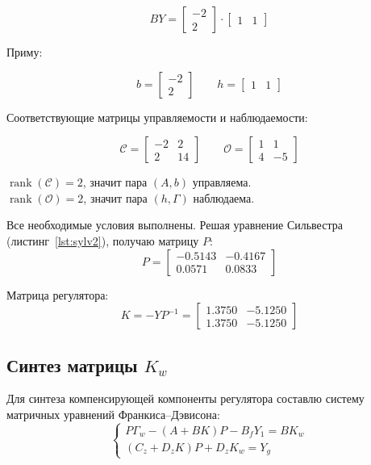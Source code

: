 \documentclass[a4paper,12pt]{article}
\begin{document}
\begin{enumerate}
	\[BY=\begin{bmatrix}
		-2\\2
	\end{bmatrix} \cdot
	\begin{bmatrix}
		1&1
	\end{bmatrix}\]
	
	Приму:
	
	\[b=\begin{bmatrix}
		-2\\2
	\end{bmatrix} \qquad
	h=\begin{bmatrix}
		1&1
	\end{bmatrix}\]
	
 	Соответствующие матрицы управляемости и наблюдаемости:
 	
 	\[
 	\mathcal{C} = \begin{bmatrix}
 		-2&2\\2&14
 	\end{bmatrix} \qquad 
 	\mathcal{O} =\begin{bmatrix}
 	1&1\\4&-5
 	\end{bmatrix}
 	\]
	
	\(\operatorname{rank}(\mathcal{C}) = 2\), значит пара \((A,b)\) управляема. \\
	\(\operatorname{rank}(\mathcal{O}) = 2\), значит пара \((h,\Gamma)\) наблюдаема. 
	

\end{enumerate}



Все необходимые условия выполнены. Решая уравнение Сильвестра (листинг~\ref{lst:sylv2}), получаю матрицу $P$:
\[
P = \begin{bmatrix} -0.5143 & -0.4167 \\ 0.0571 & 0.0833 \end{bmatrix}
\]

Матрица регулятора:
\[
K = -YP^{-1} = \begin{bmatrix} 1.3750 & -5.1250 \\ 1.3750 & -5.1250 \end{bmatrix}
\]

\subsection{Синтез матрицы \(K_w\)}

Для синтеза компенсирующей компоненты регулятора составлю систему матричных уравнений Франкиса--Дэвисона:
\[
\begin{cases}
	P \Gamma_w - (A + BK)P - B_f Y_1 = B K_w \\
	(C_z + D_z K)P + D_z K_w = Y_g
\end{cases}
\]
\end{document}
